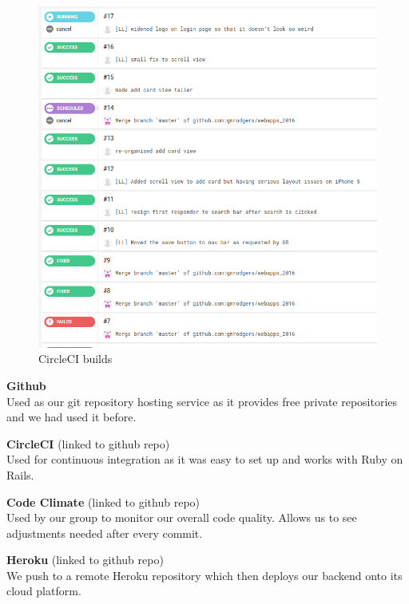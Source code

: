 \documentclass[a4wide, 11pt]{article}
\begin{document}
\begin{itemize}
    \parbox[t]{\dimexpr\textwidth-\leftmargin}{%
      \vspace{-2.5mm}
      \begin{figure}
        \centering
        \vspace{-\baselineskip}
		\includegraphics[scale=0.25]{builds.png}
        \caption{CircleCI builds}
      \end{figure}
\item \textbf{Github}\\
Used as our git repository hosting service as it provides free private repositories and we had used it before.
\item \textbf{CircleCI} (linked to github repo)\\
Used for continuous integration as it was easy to set up and works with Ruby on Rails.
\item \textbf{Code Climate} (linked to github repo)\\
Used by our group to monitor our overall code quality.  Allows us to see adjustments needed after every commit.
\item \textbf{Heroku} (linked to github repo)\\
We push to a remote Heroku repository which then deploys our backend onto its 
cloud platform.
    }
  \end{itemize}
\end{document}
